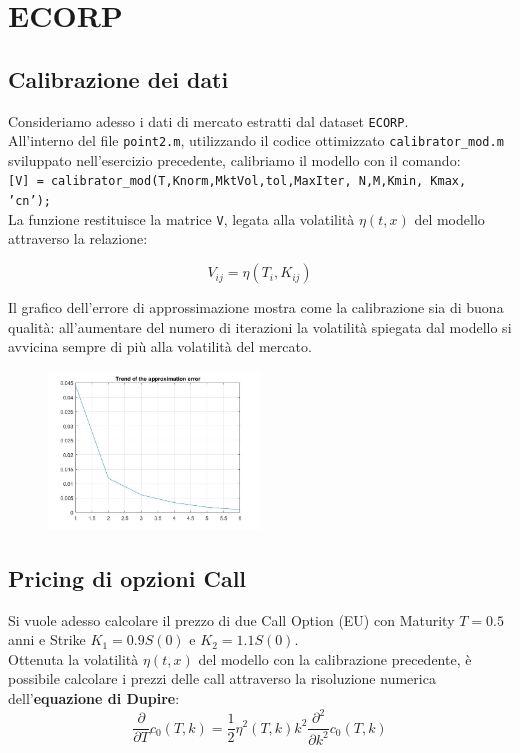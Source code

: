 \documentclass[11pt]{article}
\begin{document}
\vfill
\section{ECORP}

\subsection{Calibrazione dei dati}
Consideriamo adesso i dati di mercato estratti dal dataset \texttt{ECORP}.\\
All'interno del file \texttt{point2.m}, utilizzando il codice ottimizzato \texttt{calibrator\_mod.m} sviluppato nell'esercizio precedente, calibriamo il modello con il comando:\\

\texttt{[V] = calibrator\_mod(T,Knorm,MktVol,tol,MaxIter, N,M,Kmin, Kmax, 'cn');}\\

La funzione restituisce la matrice \texttt{V}, legata alla volatilità $\eta(t,x)$ del modello attraverso la relazione:

\begin{equation}
V_{ij} = \eta(T_i,K_{ij})
\end{equation}

Il grafico dell'errore di approssimazione mostra come la calibrazione sia di buona qualità: all'aumentare del numero di iterazioni la volatilità spiegata dal modello si avvicina sempre di più alla volatilità del mercato.

\begin{figure}[H]
\centering
\includegraphics[width=0.5\textwidth]{cal}
\end{figure}

\subsection{Pricing di opzioni Call}
Si vuole adesso calcolare il prezzo di due Call Option (EU) con Maturity $T=0.5$ anni e Strike $K_1 = 0.9 S(0)$ e $K_2 = 1.1S(0)$.\\
Ottenuta la volatilità $\eta(t,x)$ del modello con la calibrazione precedente, è possibile calcolare i prezzi delle call attraverso la risoluzione numerica dell'\textbf{equazione di Dupire}:
\begin{equation}
\frac{\partial}{\partial T}c_0(T,k) = \frac{1}{2}\eta^2(T,k)k^2\frac{\partial^2}{\partial k^2}c_0(T,k)
\end{equation} 
\end{document}
